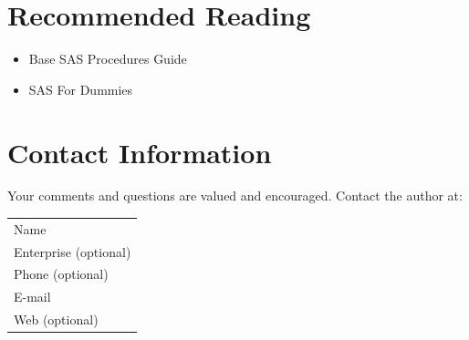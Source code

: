 \documentclass{sugconf}
\begin{document}
\section{Recommended Reading}

\begin{itemize}
    \item Base SAS\textregistered\xspace Procedures Guide 
    \item SAS\textregistered\xspace For Dummies\textregistered
\end{itemize}

\section{Contact Information}

Your comments and questions are valued and encouraged. Contact the author at:

\begin{tabular}[t]{l}
    Name  \\
    Enterprise (optional)  \\
    Phone (optional)  \\
    E-mail  \\ 
    Web (optional)  \\
\end{tabular}

\SASisRegisteredTrademark

\OtherTrademarks
\end{document}
